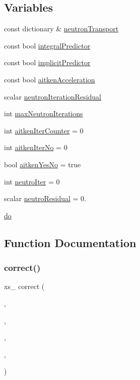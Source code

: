 \subsection*{Variables}
\begin{DoxyCompactItemize}
\item 
const dictionary \& \hyperlink{solveNeutronics_8H_ac82f3800c6fe7f00c65fbf04d3c1050d}{neutron\+Transport}
\item 
const bool \hyperlink{solveNeutronics_8H_a47288f41defba643691d6ea37cc5cf2c}{integral\+Predictor}
\item 
const bool \hyperlink{solveNeutronics_8H_a46db48a7bd00bc40295bd4cf91143649}{implicit\+Predictor}
\item 
const bool \hyperlink{solveNeutronics_8H_a94a477396c84cabf64ee11e6cc47bc86}{aitken\+Acceleration}
\item 
scalar \hyperlink{solveNeutronics_8H_a868e32a0d29170b5c556eabe69917730}{neutron\+Iteration\+Residual}
\item 
int \hyperlink{solveNeutronics_8H_aeeb27a033c3d21cdfe4cc47565bc21a2}{max\+Neutron\+Iterations}
\item 
int \hyperlink{solveNeutronics_8H_a99558413abb34d76245c07185d7117d4}{aitken\+Iter\+Counter} = 0
\item 
int \hyperlink{solveNeutronics_8H_a0a1c3011c74baf349d41384de3b18ee3}{aitken\+Iter\+No} = 0
\item 
bool \hyperlink{solveNeutronics_8H_a54b3011be8f08fc82447c253fd5ddfef}{aitken\+Yes\+No} = true
\item 
int \hyperlink{solveNeutronics_8H_a5ea48e0170faff29dfdd3cbba330d51d}{neutro\+Iter} = 0
\item 
scalar \hyperlink{solveNeutronics_8H_a2a3baa00ecfd5a47c6f6ba475a66d2c6}{neutro\+Residual} = 0.
\item 
\hyperlink{solveNeutronics_8H_a721c6ff80a6d3e4ad4ffa52a04c60085}{do}
\end{DoxyCompactItemize}


\subsection{Function Documentation}
\mbox{\label{solveNeutronics_8H_a12046a30b04bbfb1f05948a712e65123}} 
\subsubsection{\texorpdfstring{correct()}{correct()}}
{\footnotesize\ttfamily xs\+\_\+ correct (\begin{DoxyParamCaption}\item[{T\+Fuel\+\_\+}]{,  }\item[{T\+Clad\+\_\+}]{,  }\item[{rho\+Cool\+\_\+}]{,  }\item[{T\+Cool\+\_\+}]{,  }\item[{disp\+\_\+}]{ }\end{DoxyParamCaption})}



